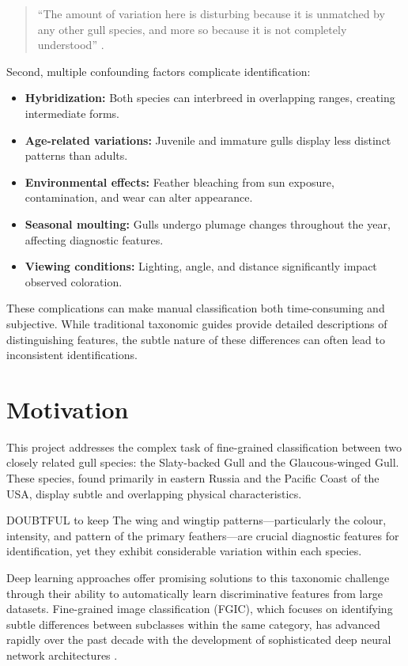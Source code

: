 \documentclass[a4paper,12pt]{article}
\begin{document}
\begin{quote}
    ``The amount of variation here is disturbing because it is unmatched by any other gull species, and more so because it is not completely understood'' \citep{adriaens2022gulls}.
\end{quote}

Second, multiple confounding factors complicate identification:
\begin{itemize}
    \item \textbf{Hybridization:} Both species can interbreed in overlapping ranges, creating intermediate forms.
    \item \textbf{Age-related variations:} Juvenile and immature gulls display less distinct patterns than adults.
    \item \textbf{Environmental effects:} Feather bleaching from sun exposure, contamination, and wear can alter appearance.
    \item \textbf{Seasonal moulting:} Gulls undergo plumage changes throughout the year, affecting diagnostic features.
    \item \textbf{Viewing conditions:} Lighting, angle, and distance significantly impact observed coloration.
\end{itemize} \citep{adriaens2022}

These complications can make manual classification both time-consuming and subjective. While traditional taxonomic guides provide detailed descriptions of distinguishing features, the subtle nature of these differences can often lead to inconsistent identifications.


\section*{Motivation}

This project addresses the complex task of fine-grained classification between two closely related gull species: the Slaty-backed Gull and the Glaucous-winged Gull. These species, found primarily in eastern Russia and the Pacific Coast of the USA, display subtle and overlapping physical characteristics. 


DOUBTFUL to keep
The wing and wingtip patterns—particularly the colour, intensity, and pattern of the primary feathers—are crucial diagnostic features for identification, yet they exhibit considerable variation within each species.


Deep learning approaches offer promising solutions to this taxonomic challenge through their ability to automatically learn discriminative features from large datasets. Fine-grained image classification (FGIC), which focuses on identifying subtle differences between subclasses within the same category, has advanced rapidly over the past decade with the development of sophisticated deep neural network architectures \citet{karpathy2015}.
\end{document}
